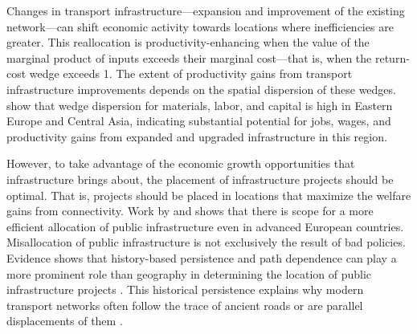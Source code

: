 \documentclass[a4paper]{article}
\begin{document}
Changes in transport infrastructure---expansion and improvement of the existing network---can shift economic activity towards locations where inefficiencies are greater. This reallocation is productivity-enhancing when the value of the marginal product of inputs exceeds their marginal cost---that is, when the return-cost wedge exceeds 1. The extent of productivity gains from transport infrastructure improvements depends on the spatial dispersion of these wedges. \citet{cockriel2025aggregate} show that wedge dispersion for materials, labor, and capital is high in Eastern Europe and Central Asia, indicating substantial potential for jobs, wages, and productivity gains from expanded and upgraded infrastructure in this region.  \newline

However, to take advantage of the economic growth opportunities that infrastructure brings about, the placement of infrastructure projects should be optimal. That is, projects should be placed in locations that maximize the welfare gains from connectivity. %
Work by \citet{fajgelbaum2025optimal} and \citet{fajgelbaum2020optimal} shows that there is scope for a more efficient allocation of public infrastructure even in advanced European countries. Misallocation of public infrastructure is not exclusively the result of bad policies. Evidence shows that history-based persistence and path dependence can play a more prominent role than geography in determining the location of public infrastructure projects \citep{allen2022persistence, graff2024spatial}. This historical persistence explains why modern transport networks often follow the trace of ancient roads or are parallel displacements of them \citep{volpe2013roads}.  \newline
\end{document}
